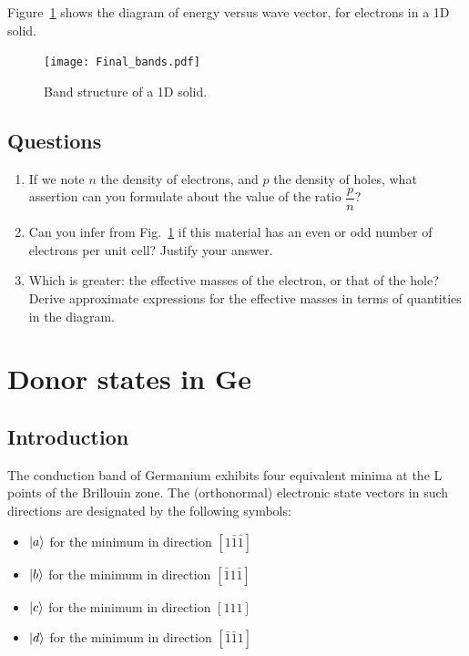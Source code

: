 Figure~\ref{fig:bands} shows the diagram of energy versus wave vector, for
electrons in a 1D solid.

\begin{figure}[h]
  \centering
  \texttt{[image: Final\_bands.pdf]}
  \caption{Band structure of a 1D solid.\label{fig:bands}}
\end{figure}

\subsection{Questions}

\begin{enumerate}[label=(\roman*)]
\item If we note $n$ the density of electrons, and $p$ the density of
  holes, what assertion can you formulate about the value of the ratio
  $\dfrac{p}{n}$?
\item Can you infer from Fig.~\ref{fig:bands} if this material has an
  even or odd number of electrons per unit cell? Justify your answer.
\item Which is greater: the effective masses of the electron, or that
  of the hole? Derive approximate expressions for the effective masses
  in terms of quantities in the diagram.
\end{enumerate}

\section{Donor states in Ge}

\subsection{Introduction}

The conduction band of Germanium exhibits four equivalent minima at
the L points of the Brillouin zone. The (orthonormal) electronic state
vectors in such directions are designated by the following symbols:

\begin{itemize}
\item $\left| a \right>$ for the minimum in direction $[1\bar{1}\bar{1}]$
\item $\left| b \right>$ for the minimum in direction $[\bar{1}1\bar{1}]$
\item $\left| c \right>$ for the minimum in direction $[111]$
\item $\left| d \right>$ for the minimum in direction $[\bar{1}\bar{1}1]$
\end{itemize}

